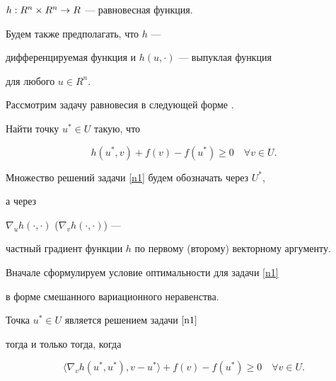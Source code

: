 $h :\linebreak R^n \times R^n \rightarrow R$ --- равновесная функция. 


Будем также предполагать, что $h$ --- 


дифференцируемая функция и $h(u,\cdot)$ --- выпуклая функция 


для любого $u \in R^n$.





Рассмотрим задачу равновесия в следующей форме \cite{BC84}. 





\begin{probs}\label{n1}


Найти точку $u^* \in U$ такую, что


$$


h(u^*,v) + f(v) - f(u^*) \ge 0 \quad \forall v \in U.


$$


\end{probs}





\noindent{}Множество решений задачи \ref{n1} будем обозначать через $U^*$, 


а через 


$\nabla_u h(\cdot, \cdot)$ ($\nabla_v h(\cdot, \cdot)$) ---


частный градиент функции $h$ по первому (второму) векторному аргументу.





Вначале сформулируем условие оптимальности для задачи \ref{n1} 


в форме смешанного вариационного неравенства.





\begin{props}\label{p11}


Точка $u^* \in U$ является решением задачи $\ref{n1}$


тогда и только тогда, когда 


\begin{equation} \label{n1a}


\langle \nabla_v h(u^*,u^*), v - u^*\rangle +


f(v) - f(u^*) \ge 0 \quad \forall v \in U.


\end{equation}


\end{props}





